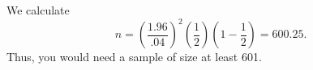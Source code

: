 We calculate
\[n = \left(\frac {1.96} {.04} \right)^2\left(\frac 1 2\right) \left(1 - \frac 1 2 \right) = 600.25.\]
Thus, you would need a sample of size at least 601.